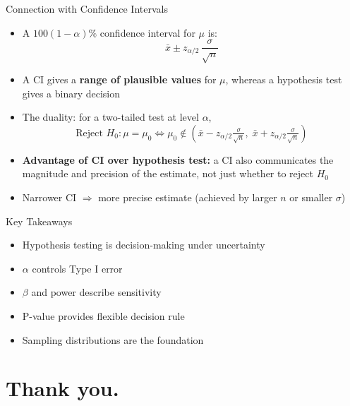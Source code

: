 \documentclass[12pt, aspectratio=169]{beamer}
\begin{document}
    \begin{frame}{Connection with Confidence Intervals}
        \begin{itemize}
            \item A $100(1-\alpha)\%$ confidence interval for $\mu$ is:
            \[
                \bar{x} \pm z_{\alpha/2}\,\frac{\sigma}{\sqrt{n}}
            \]
            \item A CI gives a \textbf{range of plausible values} for $\mu$,
                whereas a hypothesis test gives a binary decision
            \item The duality: for a two-tailed test at level $\alpha$,
            \[
                \text{Reject } H_0: \mu = \mu_0
                \iff
                \mu_0 \notin \left(\bar{x} - z_{\alpha/2}\tfrac{\sigma}{\sqrt{n}},\;
                                    \bar{x} + z_{\alpha/2}\tfrac{\sigma}{\sqrt{n}}\right)
            \]
            \item \textbf{Advantage of CI over hypothesis test:}
                a CI also communicates the magnitude and precision of the estimate,
                not just whether to reject $H_0$
            \item Narrower CI $\Rightarrow$ more precise estimate
                (achieved by larger $n$ or smaller $\sigma$)
        \end{itemize}
    \end{frame}


    \begin{frame}{Key Takeaways}
        \begin{itemize}
            \item Hypothesis testing is decision-making under uncertainty
            \item $\alpha$ controls Type I error
            \item $\beta$ and power describe sensitivity
            \item P-value provides flexible decision rule
            \item Sampling distributions are the foundation
        \end{itemize}
    \end{frame}

    \section*{Thank you.}
\end{document}
